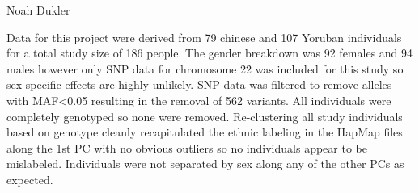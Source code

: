 \documentclass[11pt,a4paper]{article}
\begin{document}
\noindent Noah Dukler

Data for this project were derived from 79 chinese and 107 Yoruban individuals for a total study size of 186 people. The gender breakdown was 92 females and 94 males however only SNP data for chromosome 22 was included for this study so sex specific effects are highly unlikely. SNP data was filtered to remove alleles with MAF<0.05 resulting in the removal of 562 variants. All individuals were completely genotyped so none were removed. Re-clustering all study individuals based on genotype cleanly recapitulated the ethnic labeling in the HapMap files along the 1st PC with no obvious outliers so no individuals appear to be mislabeled. Individuals were not separated by sex along any of the other PCs as expected.   
\end{document}
